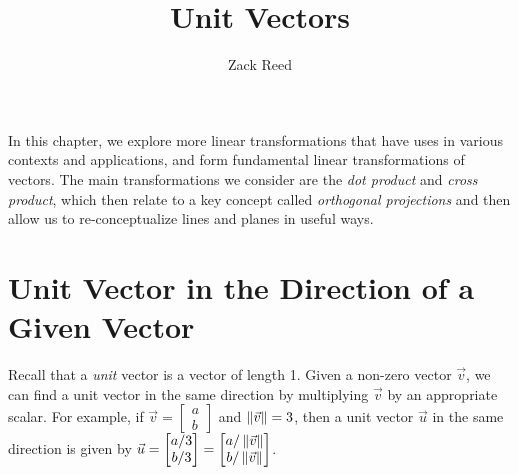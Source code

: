 \documentclass{ximera}
\author{Zack Reed}
\title{Unit Vectors}
\begin{document}
\begin{abstract}

\end{abstract}
\maketitle

In this chapter, we explore more linear transformations that have uses in various contexts and applications, and form fundamental linear transformations of vectors. The main transformations we consider are the \emph{dot product} and \emph{cross product}, which then relate to a key concept called \emph{orthogonal projections} and then allow us to re-conceptualize lines and planes in useful ways.

\section*{Unit Vector in the Direction of a Given Vector}
Recall that a {\it unit} vector is a vector of length 1.  Given a non-zero vector $\vec{v}$, we can find a unit vector in the same direction by multiplying $\vec{v}$ by an appropriate scalar.  For example, if $\vec{v}=\begin{bmatrix}a\\b\end{bmatrix}$ and $\left\|\vec{v}\right\|=3$, then a unit vector $\vec{u}$ in the same direction is given by $\vec{u}=\begin{bmatrix}a/3\\b/3\end{bmatrix}=\begin{bmatrix}a/\left\|\vec{v}\right\|\\b/\left\|\vec{v}\right\|\end{bmatrix}$.


 
\begin{center}
\end{center}
\end{document}
